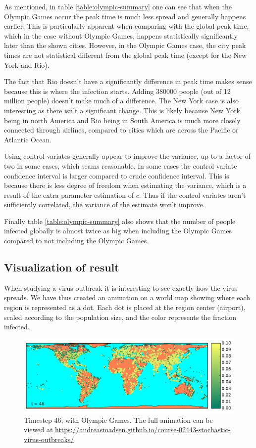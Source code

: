 As mentioned, in table \ref{table:olympic-summary} one can see that when the Olympic Games occur the peak time is much less spread and generally happens earlier. This is particularly apparent when comparing with the global peak time, which in the case without Olympic Games, happens statistically significantly later than the shown cities. However, in the Olympic Games case, the city peak times are not statistical different from the global peak time (except for the New York and Rio).

The fact that Rio doesn't have a significantly difference in peak time makes sense because this is where the infection starts. Adding 380000 people (out of 12 million people) doesn't make much of a difference. The New York case is also interesting as there isn't a significant change. This is likely because New York being in north America and Rio being in South America is much more closely connected through airlines, compared to cities which are across the Pacific or Atlantic Ocean.

Using control variates generally appear to improve the variance, up to a factor of two in some cases, which seams reasonable. In some cases the control variate confidence interval is larger compared to crude confidence interval. This is because there is less degree of freedom when estimating the variance, which is a result of the extra parameter estimation of $c$. Thus if the control variates aren't sufficiently correlated, the variance of the estimate won't improve.

Finally table \ref{table:olympic-summary} also shows that the number of people infected globally is almost twice as big when including the Olympic Games compared to not including the Olympic Games.

\subsection{Visualization of result}
When studying a virus outbreak it is interesting to see exactly how the virus spreads. We have thus created an animation on a world map showing where each region is represented as a dot. Each dot is placed at the region center (airport), scaled according to the population size, and the color represents the fraction infected.

\begin{figure}[H]
	\centering
	\includegraphics[width=1.0 \linewidth]{plots/gifs/frames/rio-46}
	\caption{Timestep 46, with Olympic Games. The full animation can be viewed at
		\url{https://andreasmadsen.github.io/course-02443-stochastic-virus-outbreaks/}}
	\label{fig:rio-46}
\end{figure}

